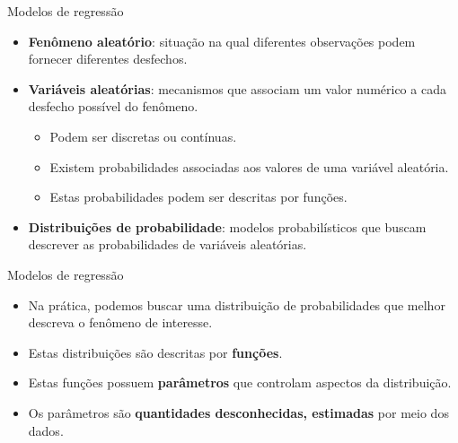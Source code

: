 \documentclass[
  ignorenonframetext,
  serif,
  professionalfont,
  usenames,
  dvipsnames,
  aspectratio = 169]{beamer}
\begin{document}
\begin{frame}{Modelos de regressão}
\protect\hypertarget{modelos-de-regressuxe3o-1}{}
\begin{itemize}
    \itemsep 2ex

  \item \textbf{Fenômeno aleatório}: situação na qual diferentes observações podem fornecer diferentes desfechos. 
  
  \item \textbf{Variáveis aleatórias}: mecanismos que associam um valor numérico a cada desfecho possível do fenômeno. 
  
  \begin{itemize}
    \item Podem ser discretas ou contínuas.
    \item Existem probabilidades associadas aos valores de uma variável aleatória.
    \item Estas probabilidades podem ser descritas por funções.
  \end{itemize}

  \item \textbf{Distribuições de probabilidade}: modelos probabilísticos que buscam descrever as probabilidades de variáveis aleatórias.

  \end{itemize}
\end{frame}

\begin{frame}{Modelos de regressão}
\protect\hypertarget{modelos-de-regressuxe3o-2}{}
\begin{itemize}
    \itemsep 2ex
  
  \item Na prática, podemos buscar uma distribuição de probabilidades que melhor descreva o fenômeno de interesse. 
  
  \item Estas distribuições são descritas por \textbf{funções}. 
  
  \item Estas funções possuem \textbf{parâmetros} que controlam aspectos da distribuição.
  
  \item Os parâmetros são \textbf{quantidades desconhecidas, estimadas} por meio dos dados.
  
  \end{itemize}
\end{frame}
\end{document}
